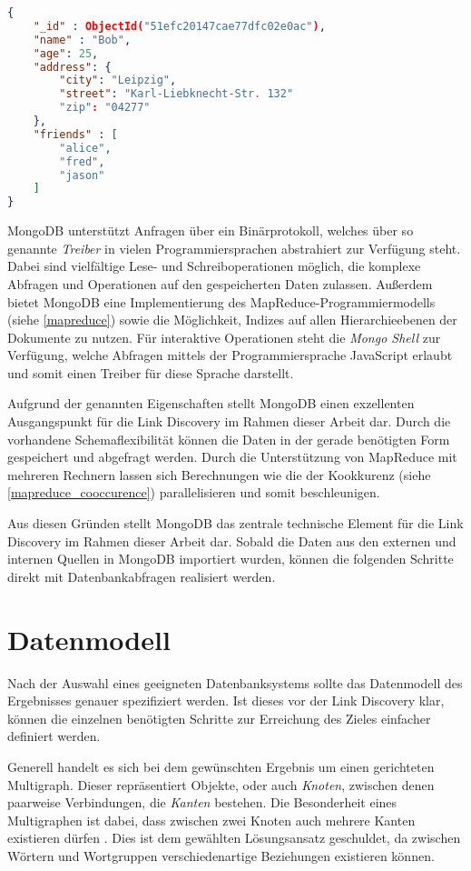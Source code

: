 \begin{lstlisting}[language=json, label={lst:json}, caption={Ein Beispiel für ein Dokument in MongoDB}]
{
    "_id" : ObjectId("51efc20147cae77dfc02e0ac"),
    "name" : "Bob",
    "age": 25,
    "address": {
        "city": "Leipzig",
        "street": "Karl-Liebknecht-Str. 132"
        "zip": "04277"
    },
    "friends" : [
        "alice",
        "fred",
        "jason"
    ]
}
\end{lstlisting}

MongoDB unterstützt Anfragen über ein Binärprotokoll, welches über so genannte \emph{Treiber} in vielen Programmiersprachen abstrahiert zur Verfügung steht. Dabei sind vielfältige Lese- und Schreiboperationen möglich, die komplexe Abfragen und Operationen auf den gespeicherten Daten zulassen. Außerdem bietet MongoDB eine Implementierung des MapReduce-Programmiermodells (siehe \ref{mapreduce}) sowie die Möglichkeit, Indizes auf allen Hierarchieebenen der Dokumente zu nutzen. Für interaktive Operationen steht die \emph{Mongo Shell} zur Verfügung, welche Abfragen mittels der Programmiersprache JavaScript erlaubt und somit einen Treiber für diese Sprache darstellt.

Aufgrund der genannten Eigenschaften stellt MongoDB einen exzellenten Ausgangspunkt für die Link Discovery im Rahmen dieser Arbeit dar. Durch die vorhandene Schemaflexibilität können die Daten in der gerade benötigten Form gespeichert und abgefragt werden. Durch die Unterstützung von MapReduce mit mehreren Rechnern lassen sich Berechnungen wie die der Kookkurenz (siehe \ref{mapreduce_cooccurence}) parallelisieren und somit beschleunigen.

Aus diesen Gründen stellt MongoDB das zentrale technische Element für die Link Discovery im Rahmen dieser Arbeit dar. Sobald die Daten aus den externen und internen Quellen in MongoDB importiert wurden, können die folgenden Schritte direkt mit Datenbankabfragen realisiert werden.

\section{Datenmodell}

Nach der Auswahl eines geeigneten Datenbanksystems sollte das Datenmodell des Ergebnisses genauer spezifiziert werden. Ist dieses vor der Link Discovery klar, können die einzelnen benötigten Schritte zur Erreichung des Zieles einfacher definiert werden.

Generell handelt es sich bei dem gewünschten Ergebnis um einen gerichteten Multigraph. Dieser repräsentiert Objekte, oder auch \emph{Knoten}, zwischen denen paarweise Verbindungen, die \emph{Kanten} bestehen. Die Besonderheit eines Multigraphen ist dabei, dass zwischen zwei Knoten auch mehrere Kanten existieren dürfen \cite{rd2012}. Dies ist dem gewählten Lösungsansatz geschuldet, da zwischen Wörtern und Wortgruppen verschiedenartige Beziehungen existieren können.

